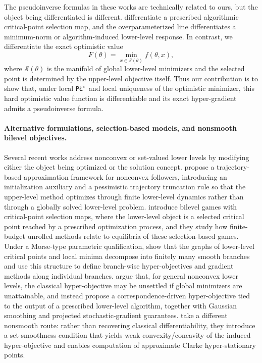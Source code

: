 \documentclass{article}
\theoremstyle{normaltheorem}
\newcommand{\PLcirc}{\texttt{P\L$^\circ$}}
\newcommand{\calS}{\mathcal{S}}
\begin{document}
The pseudoinverse formulas in these works are technically related to ours, but the object being differentiated is
different. \citet{arbel2022non} differentiate a prescribed algorithmic critical-point selection map, and the
overparameterized line \citep{vicol2021implicit,vicol2022implicitbias} differentiates a minimum-norm or algorithm-induced
lower-level response. In contrast, we differentiate the exact optimistic value
\[
F(\theta)=\min_{x\in\calS(\theta)} f(\theta,x),
\]
where \(\calS(\theta)\) is the manifold of global lower-level minimizers and the selected point is determined by the
upper-level objective itself. Thus our contribution is to show that, under local \PLcirc\ and local uniqueness of the
optimistic minimizer, this hard optimistic value function is differentiable and its exact hyper-gradient admits a
pseudoinverse formula.

\paragraph{Alternative formulations, selection-based models, and nonsmooth bilevel objectives.}
Several recent works address nonconvex or set-valued lower levels by modifying either the object being optimized or the
solution concept. \citet{liu2021towards} propose a trajectory-based approximation framework for nonconvex followers,
introducing an initialization auxiliary and a pessimistic trajectory truncation rule so that the upper-level method
optimizes through finite lower-level dynamics rather than through a globally solved lower-level problem. \citet{arbel2022non}
introduce bilevel games with critical-point selection maps, where the lower-level object is a selected critical point
reached by a prescribed optimization process, and they study how finite-budget unrolled methods relate to equilibria of
these selection-based games. Under a Morse-type parametric qualification, \citet{bolte2025bilevel} show that the graphs of
lower-level critical points and local minima decompose into finitely many smooth branches and use this structure to define
branch-wise hyper-objectives and gradient methods along individual branches. \citet{jiang2025correspondence} argue that,
for general nonconvex lower levels, the classical hyper-objective may be unsettled if global minimizers are unattainable,
and instead propose a correspondence-driven hyper-objective tied to the output of a prescribed lower-level algorithm,
together with Gaussian smoothing and projected stochastic-gradient guarantees. \citet{chen2025setsmoothness} take a
different nonsmooth route: rather than recovering classical differentiability, they introduce a set-smoothness condition
that yields weak convexity/concavity of the induced hyper-objective and enables computation of approximate Clarke
hyper-stationary points.
\end{document}
